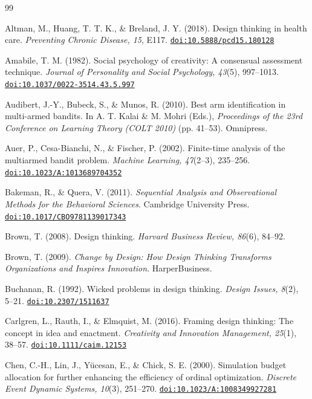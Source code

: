 \documentclass[10pt,twocolumn]{article}
\providecommand{\doi}[1]{\href{https://doi.org/#1}{\nolinkurl{doi:#1}}}
\theoremstyle{definition}
\begin{document}
\begin{thebibliography}{99}
\setlength{\itemsep}{0pt}\setlength{\parsep}{0pt}\small

 Altman, M., Huang, T. T. K., \& Breland, J. Y. (2018). Design thinking in health care. \textit{Preventing Chronic Disease, 15}, E117. \doi{10.5888/pcd15.180128}

 Amabile, T. M. (1982). Social psychology of creativity: A consensual assessment technique. \textit{Journal of Personality and Social Psychology, 43}(5), 997--1013. \doi{10.1037/0022-3514.43.5.997}

 Audibert, J.-Y., Bubeck, S., \& Munos, R. (2010). Best arm identification in multi-armed bandits. In A. T. Kalai \& M. Mohri (Eds.), \textit{Proceedings of the 23rd Conference on Learning Theory (COLT 2010)} (pp. 41--53). Omnipress.

 Auer, P., Cesa-Bianchi, N., \& Fischer, P. (2002). Finite-time analysis of the multiarmed bandit problem. \textit{Machine Learning, 47}(2--3), 235--256. \doi{10.1023/A:1013689704352}

 Bakeman, R., \& Quera, V. (2011). \textit{Sequential Analysis and Observational Methods for the Behavioral Sciences}. Cambridge University Press. \doi{10.1017/CBO9781139017343}

 Brown, T. (2008). Design thinking. \textit{Harvard Business Review, 86}(6), 84--92.

 Brown, T. (2009). \textit{Change by Design: How Design Thinking Transforms Organizations and Inspires Innovation}. HarperBusiness.

 Buchanan, R. (1992). Wicked problems in design thinking. \textit{Design Issues, 8}(2), 5--21. \doi{10.2307/1511637}

 Carlgren, L., Rauth, I., \& Elmquist, M. (2016). Framing design thinking: The concept in idea and enactment. \textit{Creativity and Innovation Management, 25}(1), 38--57. \doi{10.1111/caim.12153}

 Chen, C.-H., Lin, J., Y{\"u}cesan, E., \& Chick, S. E. (2000). Simulation budget allocation for further enhancing the efficiency of ordinal optimization. \textit{Discrete Event Dynamic Systems, 10}(3), 251--270. \doi{10.1023/A:1008349927281}


\end{thebibliography}
\end{document}

